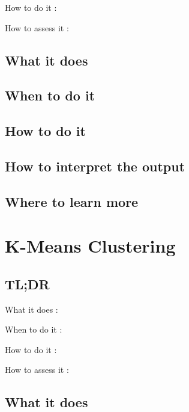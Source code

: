 \documentclass[
]{book}
\begin{document}
How to do it
:

How to assess it
:

\hypertarget{what-it-does-21}{%
\section{What it does}\label{what-it-does-21}}

\hypertarget{when-to-do-it-21}{%
\section{When to do it}\label{when-to-do-it-21}}

\hypertarget{how-to-do-it-21}{%
\section{How to do it}\label{how-to-do-it-21}}

\hypertarget{how-to-interpret-the-output-21}{%
\section{How to interpret the output}\label{how-to-interpret-the-output-21}}

\hypertarget{where-to-learn-more-21}{%
\section{Where to learn more}\label{where-to-learn-more-21}}

\hypertarget{k-means-clustering}{%
\chapter{K-Means Clustering}\label{k-means-clustering}}

\hypertarget{tldr-22}{%
\section{TL;DR}\label{tldr-22}}

What it does
:

When to do it
:

How to do it
:

How to assess it
:

\hypertarget{what-it-does-22}{%
\section{What it does}\label{what-it-does-22}}
\end{document}
